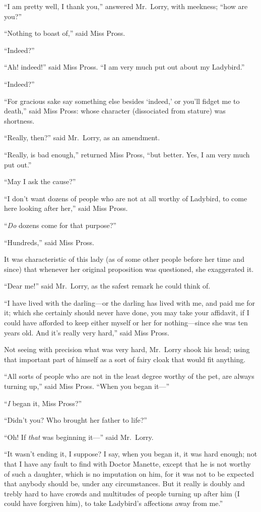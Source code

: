 ``I am pretty well, I thank you,'' answered Mr.\ Lorry, with meekness;
``how are you?''

``Nothing to boast of,'' said Miss Pross.

``Indeed?''

``Ah! indeed!'' said Miss Pross.  ``I am very much put out about my Ladybird.''

``Indeed?''

``For gracious sake say something else besides `indeed,' or you'll
fidget me to death,'' said Miss Pross:  whose character (dissociated
from stature) was shortness.

``Really, then?'' said Mr.\ Lorry, as an amendment.

``Really, is bad enough,'' returned Miss Pross, ``but better.  Yes, I am
very much put out.''

``May I ask the cause?''

``I don't want dozens of people who are not at all worthy of Ladybird,
to come here looking after her,'' said Miss Pross.

``\emph{Do} dozens come for that purpose?''

``Hundreds,'' said Miss Pross.

It was characteristic of this lady (as of some other people before her
time and since) that whenever her original proposition was questioned,
she exaggerated it.

``Dear me!'' said Mr.\ Lorry, as the safest remark he could think of.

``I have lived with the darling---or the darling has lived with me,
and paid me for it; which she certainly should never have done,
you may take your affidavit, if I could have afforded to keep either
myself or her for nothing---since she was ten years old.  And it's
really very hard,'' said Miss Pross.

Not seeing with precision what was very hard, Mr.\ Lorry shook his head;
using that important part of himself as a sort of fairy cloak that
would fit anything.

``All sorts of people who are not in the least degree worthy of the pet,
are always turning up,'' said Miss Pross.  ``When you began it---''

``\emph{I} began it, Miss Pross?''

``Didn't you?  Who brought her father to life?''

``Oh!  If \emph{that} was beginning it---'' said Mr.\ Lorry.

``It wasn't ending it, I suppose?  I say, when you began it, it was hard
enough; not that I have any fault to find with Doctor Manette, except
that he is not worthy of such a daughter, which is no imputation on
him, for it was not to be expected that anybody should be, under any
circumstances.  But it really is doubly and trebly hard to have crowds
and multitudes of people turning up after him (I could have forgiven him),
to take Ladybird's affections away from me.''

